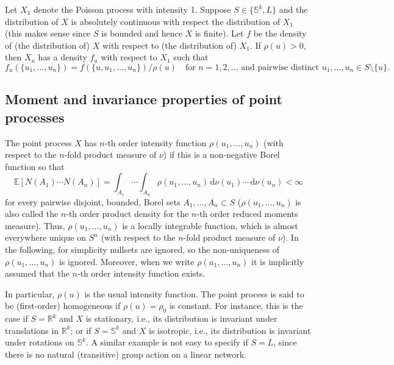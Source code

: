 \documentclass[alpha-refs]{wiley-article}
\begin{document}
 Let $X_1$ denote the Poisson process with intensity 1. Suppose $S\in\{\mathbb S^k,L\}$ and the distribution of $X$ is absolutely continuous with respect the distribution of $X_1$ (this makes sense since $S$ is bounded and hence $X$ is finite).  Let $f$ be the density of (the distribution of) $X$ with respect to (the distribution of) $X_1$.
 If $\rho(u)>0$, then $X_u$ has a density $f_u$ with respect to  $X_1$ such that
\begin{equation}\label{e:Palmdensity}
 f_u(\{u_1,\ldots,u_n\})=f(\{u,u_1,\ldots,u_n\})/\rho(u)\quad\mbox{for $n=1,2,\ldots$ and pairwise distinct }u_1,\ldots,u_n\in S\setminus\{u\}.
 \end{equation} 

\subsection{Moment and invariance properties of point processes}\label{s:3.2}

The point process $X$ has $n$-th order intensity function $\rho(u_1,\ldots,u_n)$ (with respect to the $n$-fold product measure of $\nu$) if this is a non-negative Borel function so that
\begin{equation}\label{e:1}
\mathbb E\left[N(A_1)\cdots N(A_n)\right]=\int_{A_1}\cdots\int_{A_n}\rho(u_1,\ldots,u_n)\,\mathrm d\nu(u_1)\cdots\,\mathrm d\nu(u_n)<\infty
\end{equation}
for every pairwise disjoint, bounded, Borel sets $A_1,\ldots,A_n\subset S$ ($\rho(u_1,\ldots,u_n)$ is also called the $n$-th order product density for the $n$-th order reduced moments measure). Thus, 
 $\rho(u_1,\ldots,u_n)$ is a locally integrable function, which is almost everywhere unique on $S^n$ (with respect to the $n$-fold product measure of $\nu$). 
In the following, for simplicity nullsets are ignored, so the non-uniqueness of $\rho(u_1,\ldots,u_n)$ is ignored. Moreover, when we write $\rho(u_1,\ldots,u_n)$ it is implicitly assumed that the $n$-th order intensity function exists. 

In particular, $\rho(u)$ is the usual intensity function. The point process is said to be (first-order) homogeneous if $\rho(u)=\rho_0$ is constant. For instance, this is the case if $S=\mathbb R^k$ and $X$ is stationary, i.e., its distribution is invariant under translations in $\mathbb R^k$; or if $S=\mathbb S^k$ and $X$ is isotropic, i.e., its distribution is invariant under rotations on $\mathbb S^k$. A similar example is not easy to specify if $S=L$, since there is no natural (transitive) group action on a linear network. 
\end{document}
